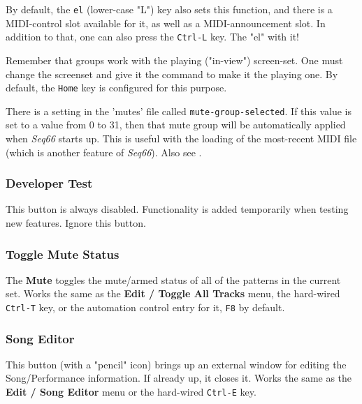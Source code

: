    By default, the \texttt{el} (lower-case "L") key also sets this function,
   and there is a MIDI-control slot available for it, as well as a
   MIDI-announcement slot.
   In addition to that, one can also press
   the \texttt{Ctrl-L} key.
   The "el" with it!

   Remember that groups work with the playing ("in-view") screen-set.
   One must change the screenset and give it the command to make it the
   playing one.
   By default, the \texttt{Home} key is configured for this purpose.

   There is a setting in the 'mutes' file called
   \texttt{mute-group-selected}.
   If this value is set to a value from 0 to 31,
   then that mute group will be automatically applied when
   \textsl{Seq66} starts up.
   This is useful with the loading of the most-recent MIDI file (which is
   another feature of \textsl{Seq66}).
   Also see .

\subsubsection{Developer Test}
\label{subsubsec:introduction_developer_test_button}

   This button is always disabled.  Functionality is added temporarily when
   testing new features. Ignore this button.

\subsubsection{Toggle Mute Status}
\label{subsubsec:introduction_toggle_mute_status_button}

   The \textbf{Mute}
   toggles the mute/armed status of all of the
   patterns in the current set.
   Works the same as the
   \textbf{Edit / Toggle All Tracks} menu, the hard-wired
   \texttt{Ctrl-T} key, or
   the automation control entry for it,
   \texttt{F8} by default.

\subsubsection{Song Editor}
\label{subsubsec:introduction_song_editor_button}

   This button (with a "pencil" icon)
   brings up an external window for editing the Song/Performance
   information.  If already up, it closes it.
   Works the same as the
   \textbf{Edit / Song Editor} menu or the hard-wired \texttt{Ctrl-E} key.

